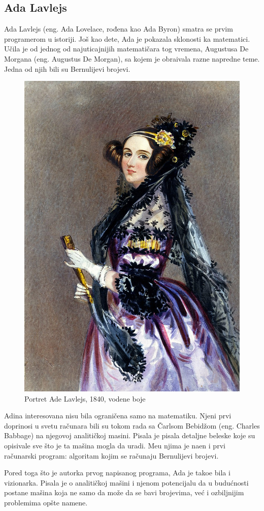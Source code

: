 \documentclass[12pt]{article}
\begin{document}
\subsection{Ada Lavlejs}
\begin{text}
Ada Lavlejs (eng. Ada Lovelace, rođena kao Ada Byron) smatra se prvim programerom u istoriji. Još kao dete, Ada je pokazala sklonosti ka matematici. Učila je od jednog od najuticajnijih matematičara tog vremena, Augustusa De Morgana (eng. Augustus De Morgan), sa kojem je obra\dj ivala razne napredne teme. Jedna od njih bili su Bernulijevi brojevi.
\end{text}

\begin{figure}[htp]
    \centering
    \includegraphics[width=0.4\linewidth]{image.png}
    \caption{Portret Ade Lavlejs, 1840, vodene boje}
\end{figure}

\begin{text}
Adina interesovana nisu bila ograničena samo na matematiku. Njeni prvi doprinosi u svetu računara bili su tokom rada sa Čarlsom Bebidžom (eng. Charles Babbage) na njegovoj analitičkoj masini. Pisala je pisala detaljne beleske koje su opisivale sve što je ta mašina mogla da uradi. Me\dj u njima je na\dj en i prvi računarski program: algoritam kojim se računaju Bernulijevi brojevi.

Pored toga što je autorka prvog napisanog programa, Ada je tako\dj e bila i vizionarka. Pisala je o analitičkoj mašini i njenom potencijalu da u budućnosti postane mašina koja ne samo da može da se bavi brojevima, već i ozbiljnijim problemima opšte namene.
\end{text}
\end{document}
